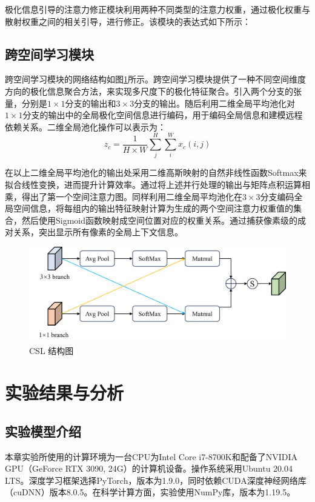 极化信息引导的注意力修正模块利用两种不同类型的注意力权重，通过极化权重与散射权重之间的相关引导，进行修正。该模块的表达式如下所示：


\subsection{跨空间学习模块}
跨空间学习模块的网络结构如图\ref{DPEN_CSL}所示。跨空间学习模块提供了一种不同空间维度方向的极化信息聚合方法，来实现多尺度下的极化特征聚合。引入两个分支的张量，分别是$1\times 1$分支的输出和$3 \times 3$分支的输出。随后利用二维全局平均池化对$1\times 1$分支的输出中的全局极化空间信息进行编码，用于编码全局信息和建模远程依赖关系。二维全局池化操作可以表示为：
\begin{equation}
    z_c=\frac{1}{H\times W}\sum_{j}^{H}\sum_{i}^{W}x_c(i,j)
\end{equation}

在以上二维全局平均池化的输出处采用二维高斯映射的自然非线性函数Softmax来拟合线性变换，进而提升计算效率。通过将上述并行处理的输出与矩阵点积运算相乘，得出了第一个空间注意力图。同样利用二维全局平均池化在$3\times 3$分支编码全局空间信息，将每组内的输出特征映射计算为生成的两个空间注意力权重值的集合，然后使用Sigmoid函数映射成空间位置对应的权重关系。通过捕获像素级的成对关系，突出显示所有像素的全局上下文信息。
\begin{figure}[h]
    \centering
    \includegraphics[width=14cm]{pic/chapter3/DPEN_CSL.png}
    \caption{CSL 结构图}
    \label{DPEN_CSL}
\end{figure}


\section{实验结果与分析}
\subsection{实验模型介绍}
本章实验所使用的计算环境为一台CPU为Intel Core i7-8700K和配备了NVIDIA GPU（GeForce RTX 3090, 24G）的计算机设备。操作系统采用Ubuntu 20.04 LTS。深度学习框架选择PyTorch，版本为1.9.0，同时依赖CUDA深度神经网络库（cuDNN）版本8.0.5。在科学计算方面，实验使用NumPy库，版本为1.19.5。

